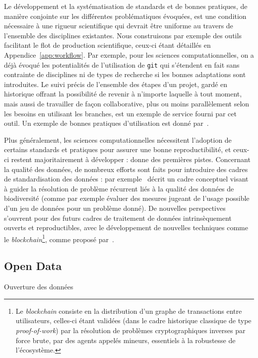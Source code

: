 Le développement et la systématisation de standards et de bonnes pratiques, de manière conjointe sur les différentes problématiques évoquées, est une condition nécessaire à une rigueur scientifique qui devrait être uniforme au travers de l'ensemble des disciplines existantes. Nous construisons par exemple des outils facilitant le flot de production scientifique, ceux-ci étant détaillés en Appendice~\ref{app:workflow}. Par exemple, pour les sciences computationnelles, on a déjà évoqué les potentialités de l'utilisation de \texttt{git} qui s'étendent en fait sans contrainte de disciplines ni de types de recherche si les bonnes adaptations sont introduites. Le suivi précis de l'ensemble des étapes d'un projet, gardé en historique offrant la possibilité de revenir à n'importe laquelle à tout moment, mais aussi de travailler de façon collaborative, plus ou moins parallèlement selon les besoins en utilisant les branches, est un exemple de service fourni par cet outil. Un exemple de bonnes pratiques d'utilisation est donné par~\cite{10.1371/journal.pcbi.1004947}.


Plus généralement, les sciences computationnelles nécessitent l'adoption de certains standards et pratiques pour assurer une bonne reproductibilité, et ceux-ci restent majoritairement à développer : \cite{wilson2017good} donne des premières pistes. Concernant la qualité des données, de nombreux efforts sont faits pour introduire des cadres de standardisation des données : par exemple~\cite{10.1371/journal.pone.0178731} décrit un cadre conceptuel visant à guider la résolution de problème récurrent liés à la qualité des données de biodiversité (comme par exemple évaluer des mesures jugeant de l'usage possible d'un jeu de données pour un problème donné). De nouvelles perspectives s'ouvrent pour des futurs cadres de traitement de données intrinsèquement ouverts et reproductibles, avec le développement de nouvelles techniques comme le \emph{blockchain}\footnote{Le \emph{blockchain} consiste en la distribution d'un graphe de transactions entre utilisateurs, celles-ci étant validées (dans le cadre historique classique de type \emph{proof-of-work}) par la résolution de problèmes cryptographiques inverses par force brute, par des agents appelés mineurs, essentiels à la robustesse de l'écosystème.}, comme proposé par~\cite{2017arXiv170706552}.




\subsection{Open Data}{Ouverture des données}


